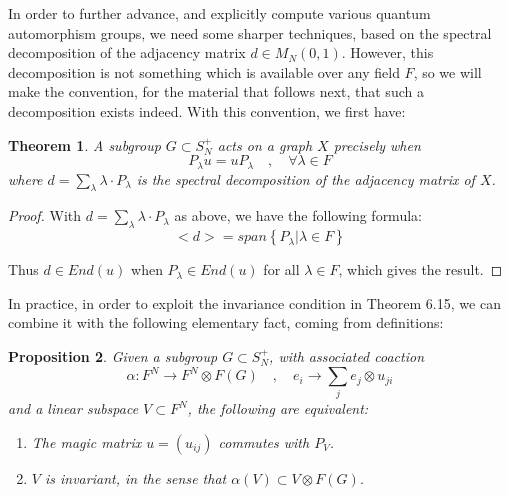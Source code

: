 \documentclass[12pt]{amsbook}
\newtheorem{theorem}{Theorem}[chapter]
\newtheorem{proposition}[theorem]{Proposition}
\begin{document}
In order to further advance, and explicitly compute various quantum automorphism groups, we need some sharper techniques, based on the spectral decomposition of the adjacency matrix $d\in M_N(0,1)$. However, this decomposition is not something which is available over any field $F$, so we will make the convention, for the material that follows next, that such a decomposition exists indeed. With this convention, we first have:


\begin{theorem}
A subgroup $G\subset S_N^+$ acts on a graph $X$ precisely when
$$P_\lambda u=uP_\lambda\quad,\quad\forall\lambda\in F$$
where $d=\sum_\lambda\lambda\cdot P_\lambda$ is the spectral decomposition of the adjacency matrix of $X$.
\end{theorem}

\begin{proof}
With $d=\sum_\lambda\lambda\cdot P_\lambda$ as above, we have the following formula:
$$<d>=span\left\{P_\lambda\Big|\lambda\in F\right\}$$

Thus $d\in End(u)$ when $P_\lambda\in End(u)$ for all $\lambda\in F$, which gives the result.
\end{proof}

In practice, in order to exploit the invariance condition in Theorem 6.15, we can combine it with the following elementary fact, coming from definitions:

\begin{proposition}
Given a subgroup $G\subset S_N^+$, with associated coaction
$$\alpha:F^N\to F^N\otimes F(G)\quad,\quad e_i\to\sum_je_j\otimes u_{ji}$$
and a linear subspace $V\subset F^N$, the following are equivalent:
\begin{enumerate}
\item The magic matrix $u=(u_{ij})$ commutes with $P_V$.

\item $V$ is invariant, in the sense that $\alpha(V)\subset V\otimes F(G)$.
\end{enumerate}
\end{proposition}
\end{document}

